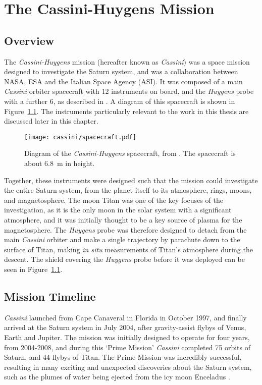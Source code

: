 \chapter{The Cassini-Huygens Mission}
\label{chap:cassini}
\section{Overview}
The \textit{Cassini-Huygens} mission (hereafter known as \textit{Cassini}) was a space mission designed to investigate the Saturn system, and was a collaboration between NASA, ESA and the Italian Space Agency (ASI). It was composed of a main \textit{Cassini} orbiter spacecraft with 12 instruments on board, and the \textit{Huygens} probe with a further 6, as described in \citet{matson2002}. A diagram of this spacecraft is shown in Figure~\ref{cassini:fig:spacecraft}. The instruments particularly relevant to the work in this thesis are discussed later in this chapter. 

\begin{figure}
\centering
\noindent\texttt{[image: cassini/spacecraft.pdf]}
\caption[Diagram of the \textit{Cassini-Huygens} spacecraft]{Diagram of the \textit{Cassini-Huygens} spacecraft, from \citet{narvaez2004}. The spacecraft is about \SI{6.8}{m} in height.}
\label{cassini:fig:spacecraft}
\end{figure}

Together, these instruments were designed such that the mission could investigate the entire Saturn system, from the planet itself to its atmosphere, rings, moons, and magnetosphere. The moon Titan was one of the key focuses of the investigation, as it is the only moon in the solar system with a significant atmosphere, and it was initially thought to be a key source of plasma for the magnetosphere. The \textit{Huygens} probe was therefore designed to detach from the main \textit{Cassini} orbiter and make a single trajectory by parachute down to the surface of Titan, making \textit{in situ} measurements of Titan's atmosphere during the descent. The shield covering the \textit{Huygens} probe before it was deployed can be seen in Figure~\ref{cassini:fig:spacecraft}.

\section{Mission Timeline}
\textit{Cassini} launched from Cape Canaveral in Florida in October 1997, and finally arrived at the Saturn system in July 2004, after gravity-assist flybys of Venus, Earth and Jupiter. The mission was initially designed to operate for four years, from 2004-2008, and during this `Prime Mission' \textit{Cassini} completed 75 orbits of Saturn, and 44 flybys of Titan. The Prime Mission was incredibly successful, resulting in many exciting and unexpected discoveries about the Saturn system, such as the plumes of water being ejected from the icy moon Enceladus \citep{dougherty2006}. 

